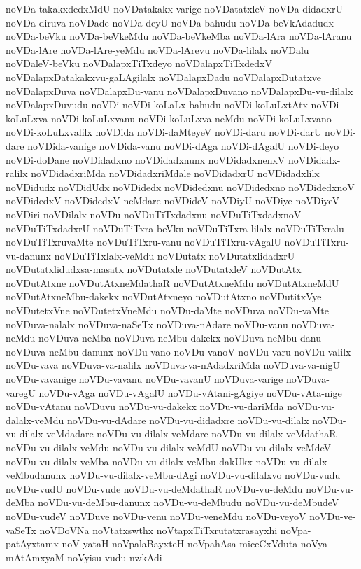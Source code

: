 {noVDa-takakxdedxMdU
noVDatakakx-varige
noVDatatxleV
noVDa-didadxrU
noVDa-diruva
noVDade
noVDa-deyU
noVDa-bahudu
noVDa-beVkAdadudx
noVDa-beVku
noVDa-beVkeMdu
noVDa-beVkeMba
noVDa-lAra
noVDa-lAranu
noVDa-lAre
noVDa-lAre-yeMdu
noVDa-lArevu
noVDa-lilalx
noVDalu
noVDaleV-beVku
noVDalapxTiTxdeyo
noVDalapxTiTxdedxV
noVDalapxDatakakxvu-gaLAgilalx
noVDalapxDadu
noVDalapxDutatxve
noVDalapxDuva
noVDalapxDu-vanu
noVDalapxDuvano
noVDalapxDu-vu-dilalx
noVDalapxDuvudu
noVDi
noVDi-koLaLx-bahudu
noVDi-koLuLxtAtx
noVDi-koLuLxva
noVDi-koLuLxvanu
noVDi-koLuLxva-neMdu
noVDi-koLuLxvano
noVDi-koLuLxvalilx
noVDida
noVDi-daMteyeV
noVDi-daru
noVDi-darU
noVDi-dare
noVDida-vanige
noVDida-vanu
noVDi-dAga
noVDi-dAgalU
noVDi-deyo
noVDi-doDane
noVDidadxno
noVDidadxnunx
noVDidadxnenxV
noVDidadx-ralilx
noVDidadxriMda
noVDidadxriMdale
noVDidadxrU
noVDidadxlilx
noVDidudx
noVDidUdx
noVDidedx
noVDidedxnu
noVDidedxno
noVDidedxnoV
noVDidedxV
noVDidedxV-neMdare
noVDideV
noVDiyU
noVDiye
noVDiyeV
noVDiri
noVDilalx
noVDu
noVDuTiTxdadxnu
noVDuTiTxdadxnoV
noVDuTiTxdadxrU
noVDuTiTxra-beVku
noVDuTiTxra-lilalx
noVDuTiTxralu
noVDuTiTxruvaMte
noVDuTiTxru-vanu
noVDuTiTxru-vAgalU
noVDuTiTxru-vu-danunx
noVDuTiTxlalx-veMdu
noVDutatx
noVDutatxlidadxrU
noVDutatxlidudxsa-masatx
noVDutatxle
noVDutatxleV
noVDutAtx
noVDutAtxne
noVDutAtxneMdathaR
noVDutAtxneMdu
noVDutAtxneMdU
noVDutAtxneMbu-dakekx
noVDutAtxneyo
noVDutAtxno
noVDutitxVye
noVDutetxVne
noVDutetxVneMdu
noVDu-daMte
noVDuva
noVDu-vaMte
noVDuva-nalalx
noVDuva-naSeTx
noVDuva-nAdare
noVDu-vanu
noVDuva-neMdu
noVDuva-neMba
noVDuva-neMbu-dakekx
noVDuva-neMbu-danu
noVDuva-neMbu-danunx
noVDu-vano
noVDu-vanoV
noVDu-varu
noVDu-valilx
noVDu-vava
noVDuva-va-nalilx
noVDuva-va-nAdadxriMda
noVDuva-va-nigU
noVDu-vavanige
noVDu-vavanu
noVDu-vavanU
noVDuva-varige
noVDuva-varegU
noVDu-vAga
noVDu-vAgalU
noVDu-vAtani-gAgiye
noVDu-vAta-nige
noVDu-vAtanu
noVDuvu
noVDu-vu-dakekx
noVDu-vu-dariMda
noVDu-vu-dalalx-veMdu
noVDu-vu-dAdare
noVDu-vu-didadxre
noVDu-vu-dilalx
noVDu-vu-dilalx-veMdadare
noVDu-vu-dilalx-veMdare
noVDu-vu-dilalx-veMdathaR
noVDu-vu-dilalx-veMdu
noVDu-vu-dilalx-veMdU
noVDu-vu-dilalx-veMdeV
noVDu-vu-dilalx-veMba
noVDu-vu-dilalx-veMbu-dakUkx
noVDu-vu-dilalx-veMbudanunx
noVDu-vu-dilalx-veMbu-dAgi
noVDu-vu-dilalxvo
noVDu-vudu
noVDu-vudU
noVDu-vude
noVDu-vu-deMdathaR
noVDu-vu-deMdu
noVDu-vu-deMba
noVDu-vu-deMbu-danunx
noVDu-vu-deMbudu
noVDu-vu-deMbudeV
noVDu-vudeV
noVDuve
noVDu-venu
noVDu-veneMdu
noVDu-veyoV
noVDu-ve-vaSeTx
noVDoVNa
noVtatxswthx
noVtapxTiTxrutatxrasayxhi
noVpa-patAyxtamx-noV-yataH
noVpalaBayxteH
noVpahAsa-miceCxVduta
noVya-mAtAmxyaM
noVyisu-vudu
nwkAdi
}
